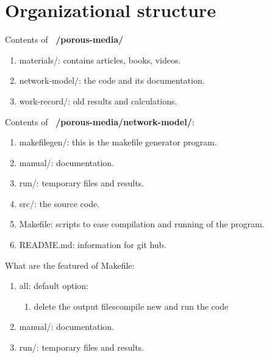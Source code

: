\section{Organizational structure}
	Contents of \textbf{~/porous-media/}
	\begin{enumerate}
		\item materials/: contains articles, books, videos.
		\item network-model/: the code and its documentation.
		\item work-record/: old results and calculations.
	\end{enumerate}

	Contents of \textbf{~/porous-media/network-model/}:
	\begin{enumerate}
		\item makefilegen/: this is the makefile generator program.
		\item manual/: documentation.
		\item run/: temporary files and results.
		\item src/: the source code.
		\item Makefile: scripts to ease compilation and running of the program.
		\item README.md: information for git hub.
	\end{enumerate}


	What are the featured of Makefile:
	\begin{enumerate}
		\item all: default option:
			\begin{enumerate}
				\item delete the output filescompile new and run the code
			\end{enumerate}
		\item manual/: documentation.
		\item run/: temporary files and results.
	\end{enumerate}
